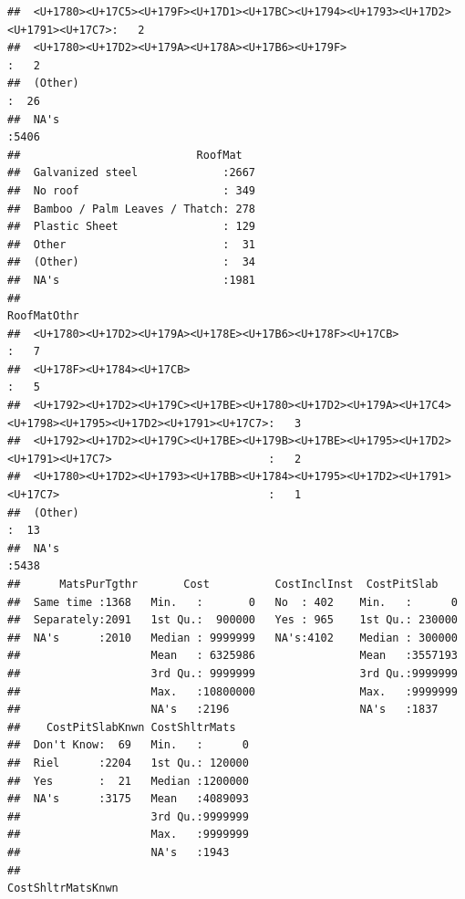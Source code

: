 \documentclass[11pt,]{article}
\begin{document}
\begin{verbatim}
##  <U+1780><U+17C5><U+179F><U+17D1><U+17BC><U+1794><U+1793><U+17D2><U+1791><U+17C7>:   2  
##  <U+1780><U+17D2><U+179A><U+178A><U+17B6><U+179F>                                :   2  
##  (Other)                                                                         :  26  
##  NA's                                                                            :5406  
##                           RoofMat    
##  Galvanized steel             :2667  
##  No roof                      : 349  
##  Bamboo / Palm Leaves / Thatch: 278  
##  Plastic Sheet                : 129  
##  Other                        :  31  
##  (Other)                      :  34  
##  NA's                         :1981  
##                                                                                                    RoofMatOthr  
##  <U+1780><U+17D2><U+179A><U+178E><U+17B6><U+178F><U+17CB>                                                :   7  
##  <U+178F><U+1784><U+17CB>                                                                                :   5  
##  <U+1792><U+17D2><U+179C><U+17BE><U+1780><U+17D2><U+179A><U+17C4><U+1798><U+1795><U+17D2><U+1791><U+17C7>:   3  
##  <U+1792><U+17D2><U+179C><U+17BE><U+179B><U+17BE><U+1795><U+17D2><U+1791><U+17C7>                        :   2  
##  <U+1780><U+17D2><U+1793><U+17BB><U+1784><U+1795><U+17D2><U+1791><U+17C7>                                :   1  
##  (Other)                                                                                                 :  13  
##  NA's                                                                                                    :5438  
##      MatsPurTgthr       Cost          CostInclInst  CostPitSlab     
##  Same time :1368   Min.   :       0   No  : 402    Min.   :      0  
##  Separately:2091   1st Qu.:  900000   Yes : 965    1st Qu.: 230000  
##  NA's      :2010   Median : 9999999   NA's:4102    Median : 300000  
##                    Mean   : 6325986                Mean   :3557193  
##                    3rd Qu.: 9999999                3rd Qu.:9999999  
##                    Max.   :10800000                Max.   :9999999  
##                    NA's   :2196                    NA's   :1837     
##    CostPitSlabKnwn CostShltrMats    
##  Don't Know:  69   Min.   :      0  
##  Riel      :2204   1st Qu.: 120000  
##  Yes       :  21   Median :1200000  
##  NA's      :3175   Mean   :4089093  
##                    3rd Qu.:9999999  
##                    Max.   :9999999  
##                    NA's   :1943     
##                                                                    CostShltrMatsKnwn

\end{verbatim}
\end{document}

